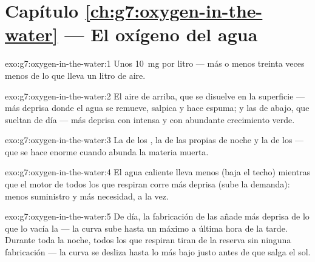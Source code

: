 \section*{Capítulo \ref{ch:g7:oxygen-in-the-water} --- El oxígeno del agua}

\begin{solution}{exo:g7:oxygen-in-the-water:1}
Unos \qty{10}{mg} por litro --- más o menos treinta veces menos de lo
que lleva un litro de aire.
\end{solution}

\begin{solution}{exo:g7:oxygen-in-the-water:2}
El aire de arriba, que se disuelve en la superficie --- más deprisa
donde el agua se remueve, salpica y hace espuma; y las  de
abajo, que sueltan  de día --- más deprisa con  intensa y con
abundante crecimiento verde.
\end{solution}

\begin{solution}{exo:g7:oxygen-in-the-water:3}
La  de los , la  de las propias 
de noche y la de los  --- que se hace enorme cuando
abunda la materia muerta.
\end{solution}

\begin{solution}{exo:g7:oxygen-in-the-water:4}
El agua caliente lleva menos  (baja el techo) mientras
que el motor de todos los que respiran corre más deprisa (sube la
demanda): menos suministro y más necesidad, a la vez.
\end{solution}

\begin{solution}{exo:g7:oxygen-in-the-water:5}
De día, la fabricación de las  añade  más deprisa de
lo que lo vacía la  --- la curva sube hasta un máximo a
última hora de la tarde. Durante toda la noche, todos los que respiran
tiran de la reserva sin ninguna fabricación --- la curva se desliza
hasta lo más bajo justo antes de que salga el sol.
\end{solution}

